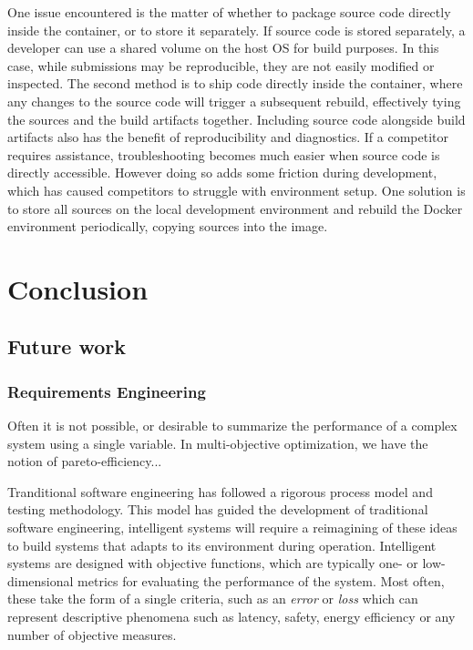 \documentclass[12pt,initial,twoside,maitrise]{dms}
\numberwithin{equation}{section}
\numberwithin{table}{chapter}
\numberwithin{figure}{chapter}
\begin{document}
One issue encountered is the matter of whether to package source code directly inside the container, or to store it separately. If source code is stored separately, a developer can use a shared volume on the host OS for build purposes. In this case, while submissions may be reproducible, they are not easily modified or inspected. The second method is to ship code directly inside the container, where any changes to the source code will trigger a subsequent rebuild, effectively tying the sources and the build artifacts together. Including source code alongside build artifacts also has the benefit of reproducibility and diagnostics. If a competitor requires assistance, troubleshooting becomes much easier when source code is directly accessible. However doing so adds some friction during development, which has caused competitors to struggle with environment setup. One solution is to store all sources on the local development environment and rebuild the Docker environment periodically, copying sources into the image.

\chapter{Conclusion}

\section{Future work}

\subsection{Requirements Engineering}

Often it is not possible, or desirable to summarize the performance of a complex system using a single variable. In multi-objective optimization, we have the notion of pareto-efficiency...

Tranditional software engineering has followed a rigorous process model and testing methodology. This model has guided the development of traditional software engineering, intelligent systems will require a reimagining of these ideas to build systems that adapts to its environment during operation. Intelligent systems are designed with objective functions, which are typically one- or low-dimensional metrics for evaluating the performance of the system. Most often, these take the form of a single criteria, such as an \textit{error} or \textit{loss} which can represent descriptive phenomena such as latency, safety, energy efficiency or any number of objective measures.
\end{document}
